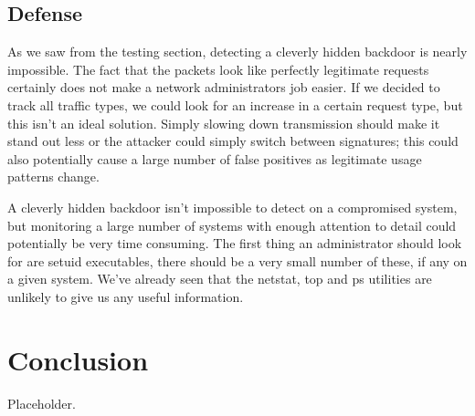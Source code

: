 \documentclass[titlepage]{article}
\begin{document}
\subsection{Defense}

As we saw from the testing section, detecting a cleverly hidden backdoor is nearly impossible.  The fact that the packets look like perfectly legitimate requests certainly does not make a network administrators job easier. If we decided to track all traffic types, we could look for an increase in a certain request type, but this isn't an ideal solution. Simply slowing down transmission should make it stand out less or the attacker could simply switch between signatures; this could also potentially cause a large number of false positives as legitimate usage patterns change.

A cleverly hidden backdoor isn't impossible to detect on a compromised system, but monitoring a large number of systems with enough attention to detail could potentially be very time consuming.  The first thing an administrator should look for are setuid executables, there should be a very small number of these, if any on a given system.  We've already seen that the netstat, top and ps utilities are unlikely to give us any useful information.

\section{Conclusion}

Placeholder.
\end{document}
